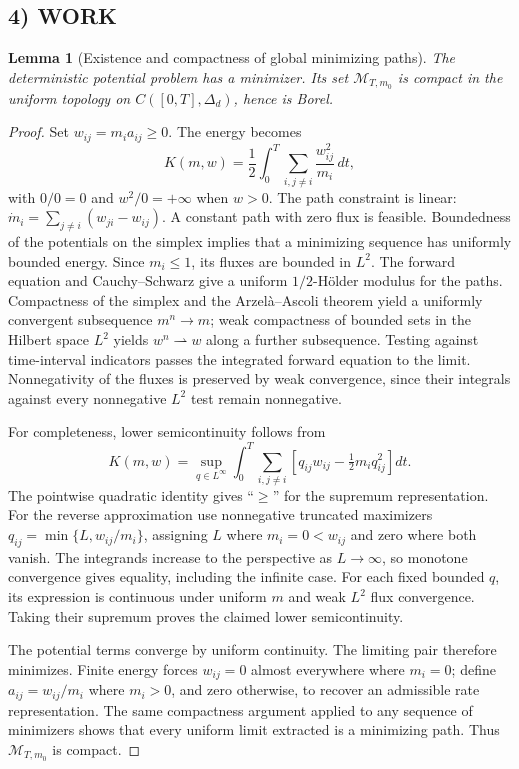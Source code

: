 \documentclass[11pt,a4paper]{article}
\newtheorem{lemma}[theorem]{Lemma}
\theoremstyle{definition}
\theoremstyle{remark}
\begin{document}
\subsection*{4) WORK}
\begin{lemma}[Existence and compactness of global minimizing paths]
The deterministic potential problem has a minimizer. Its set $\mathcal M_{T,m_0}$ is compact in the uniform topology on $C([0,T],\Delta_d)$, hence is Borel.
\end{lemma}
\begin{proof}
Set $w_{ij}=m_i a_{ij}\geq0$. The energy becomes
\[
 K(m,w)=\frac12\int_0^T\sum_{i,j\ne i}\frac{w_{ij}^2}{m_i}\,dt,
\]
with $0/0=0$ and $w^2/0=+\infty$ when $w>0$. The path constraint is linear: $\dot m_i=\sum_{j\ne i}(w_{ji}-w_{ij})$. A constant path with zero flux is feasible. Boundedness of the potentials on the simplex implies that a minimizing sequence has uniformly bounded energy. Since $m_i\leq1$, its fluxes are bounded in $L^2$. The forward equation and Cauchy--Schwarz give a uniform $1/2$-H\"older modulus for the paths. Compactness of the simplex and the Arzel\`a--Ascoli theorem yield a uniformly convergent subsequence $m^n\to m$; weak compactness of bounded sets in the Hilbert space $L^2$ yields $w^n\rightharpoonup w$ along a further subsequence. Testing against time-interval indicators passes the integrated forward equation to the limit. Nonnegativity of the fluxes is preserved by weak convergence, since their integrals against every nonnegative $L^2$ test remain nonnegative.

For completeness, lower semicontinuity follows from
\[
 K(m,w)=\sup_{q\in L^\infty}
 \int_0^T\sum_{i,j\ne i}\left[q_{ij}w_{ij}-\tfrac12m_iq_{ij}^2\right]dt.
\]
The pointwise quadratic identity gives ``$\geq$'' for the supremum representation. For the reverse approximation use nonnegative truncated maximizers $q_{ij}=\min\{L,w_{ij}/m_i\}$, assigning $L$ where $m_i=0<w_{ij}$ and zero where both vanish. The integrands increase to the perspective as $L\to\infty$, so monotone convergence gives equality, including the infinite case. For each fixed bounded $q$, its expression is continuous under uniform $m$ and weak $L^2$ flux convergence. Taking their supremum proves the claimed lower semicontinuity.

The potential terms converge by uniform continuity. The limiting pair therefore minimizes. Finite energy forces $w_{ij}=0$ almost everywhere where $m_i=0$; define $a_{ij}=w_{ij}/m_i$ where $m_i>0$, and zero otherwise, to recover an admissible rate representation. The same compactness argument applied to any sequence of minimizers shows that every uniform limit extracted is a minimizing path. Thus $\mathcal M_{T,m_0}$ is compact.
\end{proof}
\end{document}
